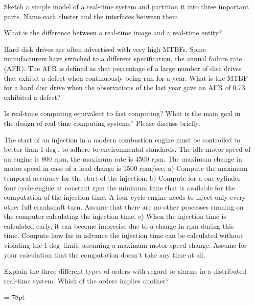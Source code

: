 
Sketch a simple model of a real-time system and partition it into three important parts. Name
each cluster and the interfaces between them.


What is the difference between a real-time image and a real-time entity?



Hard disk drives are often advertised with very high MTBFs. Some manufacturers have
switched to a different specification, the annual failure rate (AFR). The AFR is defined as
that percentage of a large number of disc drives that exhibit a defect when continuously
being run for a year.
What is the MTBF for a hard disc drive when the observations of the last year gave an AFR
of 0.73%
exhibited a defect?



Is real-time computing equivalent to fast computing? What is the main goal in the design of
real-time computing systems? Please discuss briefly.



 The start of an injection in a modern combustion engine must be controlled to better than $1\deg$,
to adhere to environmental standards. The idle motor speed of an engine is 800 rpm, the
maximum rate is 4500 rpm. The maximum change in motor speed in case of a load change
is 1500 rpm/sec.
a) Compute the maximum temporal accuracy for the start of the injection.
b) Compute for a one-cylinder four cycle engine at constant rpm the minimum time that is
available for the computation of the injection time. A four cycle engine needs to inject
only every other full crankshaft turn. Assume that there are no other processes running
on the computer calculating the injection time.
c) When the injection time is calculated early, it can become imprecise due to a change in
rpm during this time. Compute how far in advance the injection time can be calculated
without violating the $1\deg$ limit, assuming a maximum motor speed change. Assume for
your calculation that the computation doesn’t take any time at all.



Explain the three different types of orders with regard to alarms in a distributed real-time
system. Which of the orders implies another?


\pagebreak
\headheight = 78pt

